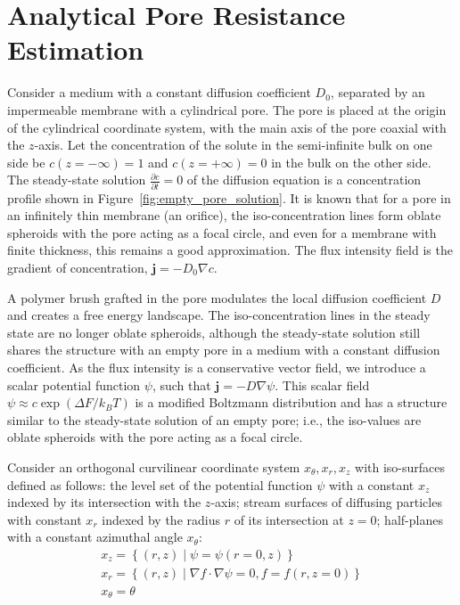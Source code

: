 \documentclass[10pt, a4paper]{article}
\begin{document}
\section{Analytical Pore Resistance Estimation}
\begin{multicols}{2}



Consider a medium with a constant diffusion coefficient $D_0$, separated by an impermeable membrane with a cylindrical pore.
The pore is placed at the origin of the cylindrical coordinate system, with the main axis of the pore coaxial with the $z$-axis.
Let the concentration of the solute in the semi-infinite bulk on one side be $c(z = -\infty) = 1$ and $c(z = +\infty) = 0$ in the bulk on the other side.
The steady-state solution $\frac{\partial c}{\partial t} = 0$ of the diffusion equation is a concentration profile shown in Figure~\ref{fig:empty_pore_solution}.
It is known that for a pore in an infinitely thin membrane (an orifice), the iso-concentration lines form oblate spheroids with the pore acting as a focal circle, and even for a membrane with finite thickness, this remains a good approximation.
The flux intensity field is the gradient of concentration, $\mathbf{j} = -D_0 \nabla c$.

A polymer brush grafted in the pore modulates the local diffusion coefficient $D$ and creates a free energy landscape.
The iso-concentration lines in the steady state are no longer oblate spheroids, although the steady-state solution still shares the structure with an empty pore in a medium with a constant diffusion coefficient.
As the flux intensity is a conservative vector field, we introduce a scalar potential function $\psi$, such that $\mathbf{j} = -D \nabla \psi$.
This scalar field $\psi \approx c \exp(\Delta F / k_B T)$ is a modified Boltzmann distribution and has a structure similar to the steady-state solution of an empty pore; i.e., the iso-values are oblate spheroids with the pore acting as a focal circle.

Consider an orthogonal curvilinear coordinate system $x_{\theta}, x_{r}, x_{z}$ with iso-surfaces defined as follows:
the level set of the potential function $\psi$ with a constant $x_{z}$ indexed by its intersection with the $z$-axis;
stream surfaces of diffusing particles with constant $x_{r}$ indexed by the radius $r$ of its intersection at $z = 0$;
half-planes with a constant azimuthal angle $x_{\theta}$:
\begin{gather}
    x_z = \left\{ (r, z) \mid \psi = \psi(r = 0, z) \right\}
    \\
    x_r = \left\{ (r, z) \mid \nabla f \cdot \nabla \psi = 0, f = f(r, z = 0) \right\}
    \\
    x_{\theta} = \theta
\end{gather}


\end{multicols}
\end{document}
